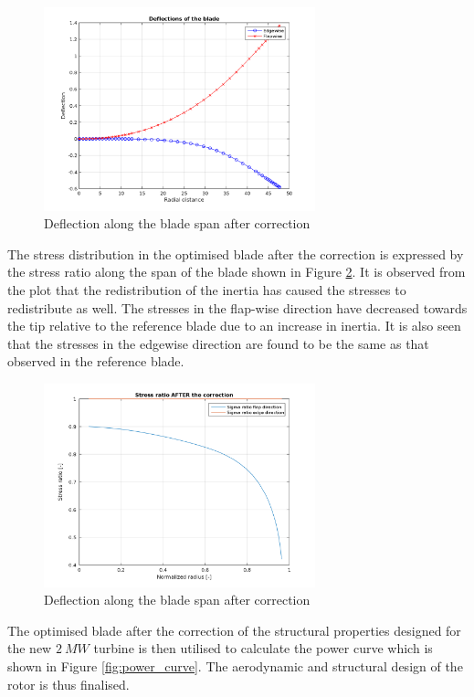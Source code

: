\begin{figure}[H]
\centering
\includegraphics[width=0.7\textwidth]{Images/deflection_optimal_corrected.png} 
\caption{Deflection along the blade span after correction}
\label{fig:deflection_after}
\end{figure}

The stress distribution in the optimised blade after the correction is expressed by the stress ratio along the span of the blade shown in Figure \ref{fig:stress_ratio_after}. It is observed from the plot that the redistribution of the inertia has caused the stresses to redistribute as well. The stresses in the flap-wise direction have decreased towards the tip relative to the reference blade due to an increase in inertia. It is also seen that the stresses in the edgewise direction are found to be the same as that observed in the reference blade.

\begin{figure}[H]
\centering
\includegraphics[width=0.7\textwidth]{Images/sigma_ratio_after.png} 
\caption{Deflection along the blade span after correction}
\label{fig:stress_ratio_after}
\end{figure}

The optimised blade after the correction of the structural properties designed for the new $2\ MW$ turbine is then utilised to calculate the power curve which is shown in Figure \ref{fig:power_curve}. The aerodynamic and structural design of the rotor is thus finalised. 

